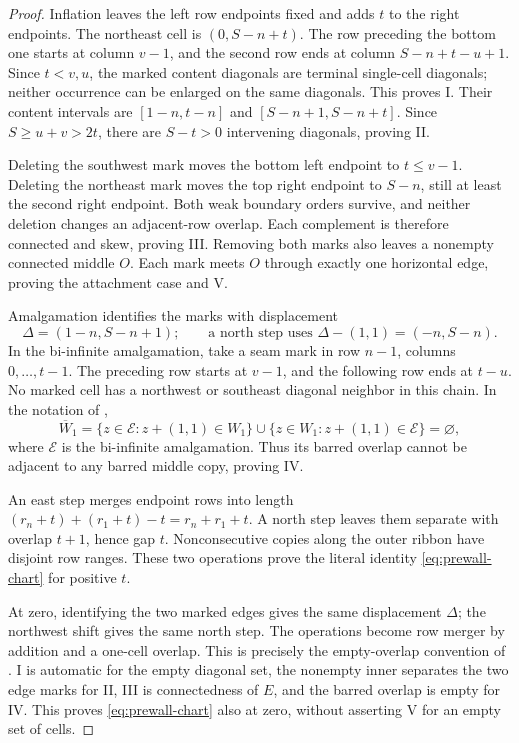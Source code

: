\documentclass[11pt,a4paper]{amsart}
\numberwithin{equation}{section}
\theoremstyle{plain}
\theoremstyle{definition}
\begin{document}
\begin{proof}
Inflation leaves the left row endpoints fixed and adds \(t\) to the right endpoints.  The northeast cell is \((0,S-n+t)\).  The row preceding the bottom one starts at column \(v-1\), and the second row ends at column \(S-n+t-u+1\).  Since \(t<v,u\), the marked content diagonals are terminal single-cell diagonals; neither occurrence can be enlarged on the same diagonals.  This proves I.  Their content intervals are \([1-n,t-n]\) and \([S-n+1,S-n+t]\).  Since \(S\ge u+v>2t\), there are \(S-t>0\) intervening diagonals, proving II.

Deleting the southwest mark moves the bottom left endpoint to \(t\le v-1\).  Deleting the northeast mark moves the top right endpoint to \(S-n\), still at least the second right endpoint.  Both weak boundary orders survive, and neither deletion changes an adjacent-row overlap.  Each complement is therefore connected and skew, proving III.  Removing both marks also leaves a nonempty connected middle \(O\).  Each mark meets \(O\) through exactly one horizontal edge, proving the attachment case and V.

Amalgamation identifies the marks with displacement
\begin{equation}\label{eq:chart-translations}
 \Delta=(1-n,S-n+1);
 \qquad\text{a north step uses }\Delta-(1,1)=(-n,S-n).
\end{equation}
In the bi-infinite amalgamation, take a seam mark in row \(n-1\), columns \(0,\ldots,t-1\).  The preceding row starts at \(v-1\), and the following row ends at \(t-u\).  No marked cell has a northwest or southeast diagonal neighbor in this chain.  In the notation of \cite{McNamara2009Classification},
\[
 \overline W_1=
 \{z\in\mathcal E:z+(1,1)\in W_1\}
 \cup\{z\in W_1:z+(1,1)\in\mathcal E\}
 =\varnothing,
\]
where \(\mathcal E\) is the bi-infinite amalgamation.  Thus its barred overlap cannot be adjacent to any barred middle copy, proving IV.

An east step merges endpoint rows into length \((r_n+t)+(r_1+t)-t=r_n+r_1+t\).  A north step leaves them separate with overlap \(t+1\), hence gap \(t\).  Nonconsecutive copies along the outer ribbon have disjoint row ranges.  These two operations prove the literal identity \eqref{eq:prewall-chart} for positive \(t\).

At zero, identifying the two marked edges gives the same displacement \(\Delta\); the northwest shift gives the same north step.  The operations become row merger by addition and a one-cell overlap.  This is precisely the empty-overlap convention of \cite[Exs.~3.7 and 3.13]{McNamara2009Classification}.  I is automatic for the empty diagonal set, the nonempty inner separates the two edge marks for II, III is connectedness of \(E\), and the barred overlap is empty for IV.  This proves \eqref{eq:prewall-chart} also at zero, without asserting V for an empty set of cells.


\end{proof}
\end{document}
